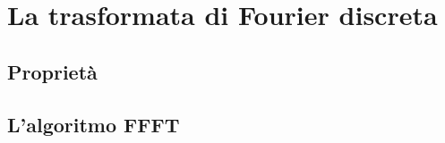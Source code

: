 
\chapter{La trasformata di Fourier discreta}
\label{Appendix4}

\section{Proprietà}
\section{L'algoritmo FFFT}
